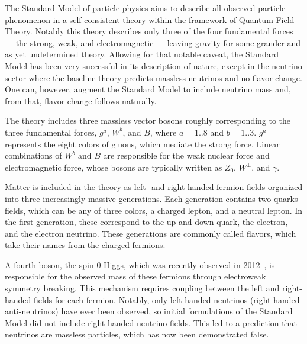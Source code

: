 The Standard Model of particle physics aims to describe all observed particle phenomenon in a self-consistent theory within the framework of Quantum Field Theory.
Notably this theory describes only three of the four fundamental forces --- the strong, weak, and electromagnetic --- leaving gravity for some grander and as yet undetermined theory. 
Allowing for that notable caveat, the Standard Model has been very successful in its description of nature, except in the neutrino sector where the baseline theory predicts massless neutrinos and no flavor change.
One can, however, augment the Standard Model to include neutrino mass and, from that, flavor change follows naturally.

The theory includes three massless vector bosons roughly corresponding to the three fundamental forces, $g^a$, $W^b$, and $B$, where $a=1..8$ and $b=1..3$.
$g^a$ represents the eight colors of gluons, which mediate the strong force.
Linear combinations of $W^b$ and $B$ are responsible for the weak nuclear force and electromagnetic force, whose bosons are typically written as $Z_0$, $W^{\pm}$, and $\gamma$.

Matter is included in the theory as left- and right-handed fermion fields organized into three increasingly massive generations.
Each generation contains two quarks fields, which can be any of three colors, a charged lepton, and a neutral lepton.
In the first generation, these correspond to the up and down quark, the electron, and the electron neutrino. 
These generations are commonly called flavors, which take their names from the charged fermions.

A fourth boson, the spin-0 Higgs, which was recently observed in 2012~\cite{higgs}, is responsible for the observed mass of these fermions through electroweak symmetry breaking.
This mechanism requires coupling between the left and right-handed fields for each fermion.
Notably, only left-handed neutrinos (right-handed anti-neutrinos) have ever been observed, so initial formulations of the Standard Model did not include right-handed neutrino fields.
This led to a prediction that neutrinos are massless particles, which has now been demonstrated false.


